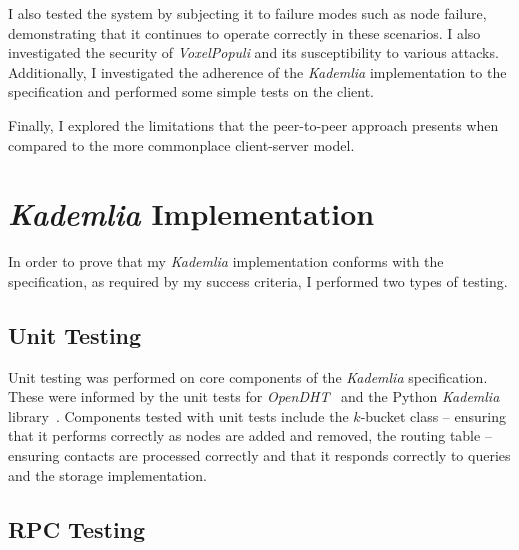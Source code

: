 \documentclass[12pt,notitlepage,a4paper]{report}
\newcommand{\kademlia}{\emph{Kademlia}}
\newcommand{\K}{$k$}
\newcommand{\voxpop}{\emph{VoxelPopuli}}
\begin{document}
	I also tested the system by subjecting it to failure modes such as node failure, demonstrating that it continues to operate correctly in these scenarios. I also investigated the security of \voxpop{} and its susceptibility to various attacks. Additionally, I investigated the adherence of the \kademlia{} implementation to the specification and performed some simple tests on the client.
	
	Finally, I explored the limitations that the peer-to-peer approach presents when compared to the more commonplace client-server model.
	
	\section{\kademlia{} Implementation}
	In order to prove that my \kademlia{} implementation conforms with the specification, as required by my success criteria, I performed two types of testing.
	
	\subsection{Unit Testing}
	Unit testing was performed on core components of the \kademlia{} specification. These were informed by the unit tests for \emph{OpenDHT}~\cite{opendht} and the Python \kademlia{} library~\cite{pykademlia}. Components tested with unit tests include the \K-bucket class -- ensuring that it performs correctly as nodes are added and removed, the routing table -- ensuring contacts are processed correctly and that it responds correctly to queries and the storage implementation.
	
	\subsection{RPC Testing}
\end{document}
